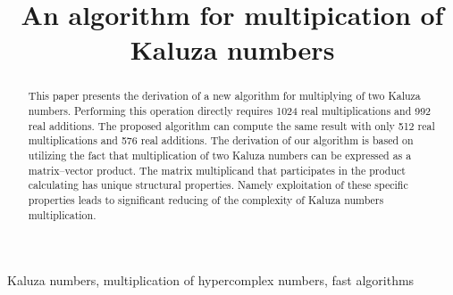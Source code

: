 \documentclass{jtacs}
\numberwithin{equation}{section}
\begin{document}
\title{An algorithm for multipication of Kaluza numbers}
\maketitle
{}









\begin{abstract}
This paper presents the derivation of a new algorithm for multiplying of two Kaluza numbers.
Performing this operation directly requires 1024 real multiplications and 992 real additions.  The proposed algorithm can compute the same result with only 512 real multiplications and 576 real additions. The derivation of our algorithm is based on utilizing the fact that multiplication of two Kaluza numbers can be expressed as a matrix–vector product. The matrix multiplicand that participates in the product calculating has unique structural properties. Namely exploitation of these specific properties leads to significant reducing of the complexity of Kaluza numbers multiplication.

\end{abstract}

\begin{keywords}
Kaluza numbers, multiplication of hypercomplex numbers, fast algorithms
\end{keywords}
\end{document}
